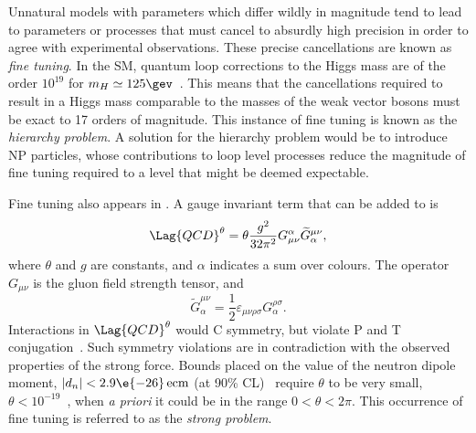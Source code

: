 Unnatural models with parameters which differ wildly in magnitude tend to
lead to parameters or processes that must cancel to absurdly
high precision in order to agree with experimental observations.
These precise cancellations are known as \emph{fine tuning}.
In the SM, quantum loop corrections to the Higgs mass are of the order $10^{19}$
for $m_H\simeq125\gev$~\cite{Chatrchyan:2012ufa,Aad:2012tfa}.
This means that the cancellations required to result in a Higgs mass comparable to the masses of
the weak vector bosons must be exact to 17 orders of magnitude.
This instance of fine tuning is known as the \emph{hierarchy problem}.
A solution for the hierarchy problem would be to introduce NP particles, whose contributions to
loop level processes reduce the magnitude of fine tuning required to a level that might be deemed
expectable.

Fine tuning also appears in \QCD.
A gauge invariant term that can be added to  is
\begin{equation}
  \Lag{QCD}^\theta = \theta\frac{g^2}{32\pi^2}
  G_{\mu\nu}^\alpha\widetilde G^{\mu\nu}_\alpha,
  \label{eq:strongcp}
\end{equation}
where $\theta$ and $g$ are constants, and $\alpha$ indicates a sum over colours.
The operator $G_{\mu\nu}$ is the gluon field strength tensor, and
\begin{equation}
  \widetilde G^{\mu\nu}_\alpha = \frac12\varepsilon_{\mu\nu\rho\sigma}G^{\rho\sigma}_\alpha.
\end{equation}
Interactions in $\Lag{QCD}^\theta$ would C symmetry, but violate P and T
conjugation~\cite{Peccei:2006as}.
Such symmetry violations are in contradiction with the observed properties of the strong
force.
Bounds placed on the value of the neutron dipole moment, $|d_n| <2.9\e{-26}\,\mathrm{ecm}$
(at 90\% CL)~\cite{Baker:2006ts} require $\theta$ to be very small,
$\theta<10^{-19}$~\cite{Crewther:PQref9}, when \emph{a priori} it could be in the range
$0<\theta<2\pi$.
This occurrence of fine tuning is referred to as the \emph{strong \CP problem}.

